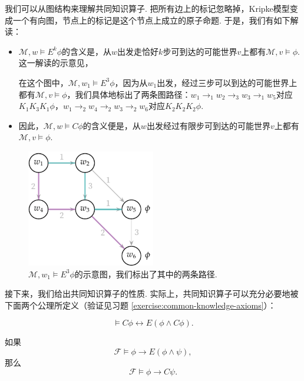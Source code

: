 我们可以从图结构来理解共同知识算子. 把所有边上的标记忽略掉，Kripke模型变成一个有向图，节点上的标记是这个节点上成立的原子命题. 于是，我们有如下解读：
\begin{itemize}
    \item $\mathcal M,w\vDash E^k\phi$的含义是，从$w$出发走恰好$k$步可到达的可能世界$v$上都有$\mathcal M,v\vDash \phi$. 这一解读的示意见，
    
    在这个图中，$\mathcal M,w_1\vDash E^3\phi$，因为从$w_1$出发，经过三步可以到达的可能世界上都有$\mathcal M,v\vDash \phi$，我们具体地标出了两条图路径：$w_1\to_1 w_2\to_3 w_3\to_1 w_5$对应$K_1K_3K_1\phi$，$w_1\to_2 w_4\to_2 w_3\to_2 w_6$对应$K_2K_2K_2\phi$.
    \item 因此，$\mathcal M,w\vDash C\phi$的含义便是，从$w$出发经过有限步可到达的可能世界$v$上都有$\mathcal M,v\vDash \phi$.
\end{itemize}
\begin{figure}[ht]
    \centering
    \includegraphics[width=0.5\textwidth]{figures/modal-logic/Ek-illustration.pdf}
    \caption{$\mathcal M,w_1\vDash E^3\phi$的示意图，我们标出了其中的两条路径.} \label{fig:Ek-illustration}
\end{figure}

接下来，我们给出共同知识算子的性质. 实际上，共同知识算子可以充分必要地被下面两个公理所定义（验证见习题 \ref{exercise:common-knowledge-axioms}）：

\begin{proposition}[不动点公理]\label{prop:common-knowledge-fixed-point}
\[\vDash C\phi\leftrightarrow E(\phi\wedge C\phi).\]
\end{proposition}

\begin{proposition}[归纳规则]\label{prop:common-knowledge-induction}
如果
\[\mathcal F\vDash \phi\to E(\phi\wedge\psi),\]
那么 
\[\mathcal  F\vDash \phi\to C\psi.\]
\end{proposition}

